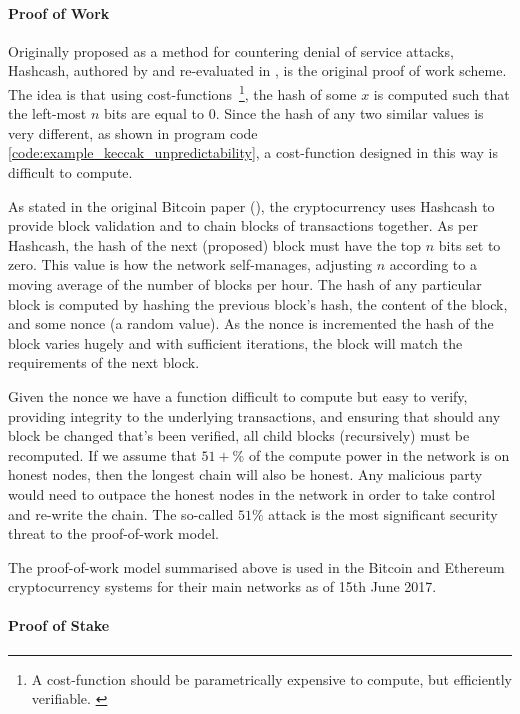 \paragraph{Proof of Work}

Originally proposed as a method for countering denial of service attacks, Hashcash, authored by \cite{hashcash:1997:misc} and re-evaluated in \cite{hashcash:2002:online}, is the original proof of work scheme. The idea is that using cost-functions~\footnote{A cost-function should be parametrically expensive to compute, but efficiently verifiable. \cite{hashcash:2002:online}}, the hash of some $x$ is computed such that the left-most $n$ bits are equal to $0$. Since the hash of any two similar values is very different, as shown in program code \ref{code:example_keccak_unpredictability}, a cost-function designed in this way is difficult to compute.



As stated in the original Bitcoin paper (\cite{bitcoin:2008:misc}), the cryptocurrency uses Hashcash to provide block validation and to chain blocks of transactions together. As per Hashcash, the hash of the next (proposed) block must have the top $n$ bits set to zero. This value is how the network self-manages, adjusting $n$ according to a moving average of the number of blocks per hour. The hash of any particular block is computed by hashing the previous block's hash, the content of the block, and some nonce (a random value). As the nonce is incremented the hash of the block varies hugely and with sufficient iterations, the block will match the requirements of the next block.

Given the nonce we have a function difficult to compute but easy to verify, providing integrity to the underlying transactions, and ensuring that should any block be changed that's been verified, all child blocks (recursively) must be recomputed. If we assume that $51+\%$ of the compute power in the network is on honest nodes, then the longest chain will also be honest. Any malicious party would need to outpace the honest nodes in the network in order to take control and re-write the chain. The so-called $51\%$ attack is the most significant security threat to the proof-of-work model.

The proof-of-work model summarised above is used in the Bitcoin and Ethereum cryptocurrency systems for their main networks as of 15th June 2017.

\paragraph{Proof of Stake}

